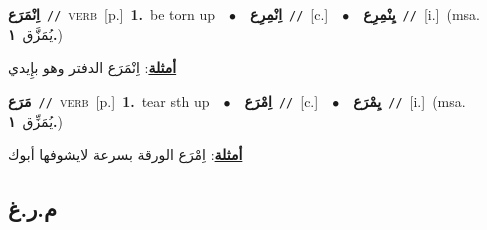 \documentclass[10pt,a4paper,twoside]{article} %
\begin{document}
\begin{multicols}{2}
{\setlength\topsep{0pt}\textbf{\foreignlanguage{arabic}{اِنْمَرَع}}\ {\color{gray}\texttt{//}\color{black}}\ \textsc{verb}\ [p.]\ \textbf{1.}~be torn up\ \ $\bullet$\ \ \setlength\topsep{0pt}\textbf{\foreignlanguage{arabic}{اِنْمِرِع}}\ {\color{gray}\texttt{//}\color{black}}\ [c.]\ \ $\bullet$\ \ \setlength\topsep{0pt}\textbf{\foreignlanguage{arabic}{يِنْمِرِع}}\ {\color{gray}\texttt{//}\color{black}}\ [i.]\ \color{gray}(msa. \foreignlanguage{arabic}{يُمَزَّق}~\foreignlanguage{arabic}{\textbf{١.}})\color{black}\  \begin{flushright}\color{gray}\foreignlanguage{arabic}{\textbf{\underline{\foreignlanguage{arabic}{أمثلة}}}: اِنْمَرَع الدفتر وهو بإِيدي}\end{flushright}\color{black}} \vspace{2mm}

{\setlength\topsep{0pt}\textbf{\foreignlanguage{arabic}{مَرَع}}\ {\color{gray}\texttt{//}\color{black}}\ \textsc{verb}\ [p.]\ \textbf{1.}~tear sth up\ \ $\bullet$\ \ \setlength\topsep{0pt}\textbf{\foreignlanguage{arabic}{اِمْرَع}}\ {\color{gray}\texttt{//}\color{black}}\ [c.]\ \ $\bullet$\ \ \setlength\topsep{0pt}\textbf{\foreignlanguage{arabic}{يِمْرَع}}\ {\color{gray}\texttt{//}\color{black}}\ [i.]\ \color{gray}(msa. \foreignlanguage{arabic}{يُمَزِّق}~\foreignlanguage{arabic}{\textbf{١.}})\color{black}\  \begin{flushright}\color{gray}\foreignlanguage{arabic}{\textbf{\underline{\foreignlanguage{arabic}{أمثلة}}}: اِمْرَع الورقة بسرعة لايشوفها أبوك}\end{flushright}\color{black}} \vspace{2mm}

\vspace{-3mm}
\subsection*{\color{blue}\foreignlanguage{arabic}{م.ر.غ}\color{blue}{}} 


\end{multicols}
\end{document}
